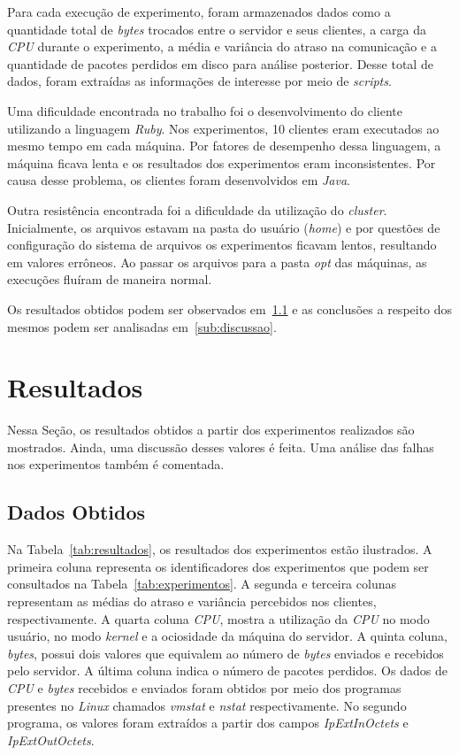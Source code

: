 \documentclass[12pt]{article}
\begin{document}
Para cada execução de experimento, foram armazenados dados como a quantidade
total de \emph{bytes} trocados entre o servidor e seus clientes, a carga da \emph{CPU}
durante o experimento, a média e variância do atraso na comunicação e a
quantidade de pacotes perdidos em disco para análise posterior. Desse total de
dados, foram extraídas as informações de interesse por meio de
\textit{scripts}.

Uma dificuldade encontrada no trabalho foi o desenvolvimento do cliente utilizando a linguagem \emph{Ruby}. Nos experimentos, 10 clientes eram executados ao mesmo tempo em cada máquina. Por fatores de desempenho dessa linguagem, a máquina ficava lenta e os resultados dos experimentos eram inconsistentes. Por causa desse problema, os clientes foram desenvolvidos em \emph{Java}.

Outra resistência encontrada foi a dificuldade da utilização do \emph{cluster}. Inicialmente, os arquivos estavam na pasta do usuário (\emph{home}) e por questões de configuração do sistema de arquivos os experimentos ficavam lentos, resultando em valores errôneos. Ao passar os arquivos para a pasta \emph{opt} das máquinas, as execuções fluíram de maneira normal. 

Os resultados obtidos podem ser observados em~\ref{sub:dados} e as conclusões a
respeito dos mesmos podem ser analisadas em~\ref{sub:discussao}.

\section{Resultados} \label{sec:resultados}

Nessa Seção, os resultados obtidos a partir dos experimentos realizados são mostrados. Ainda, uma discussão desses valores é feita. Uma análise das falhas nos experimentos também é comentada.

\subsection{Dados Obtidos} \label{sub:dados}

Na Tabela~\ref{tab:resultados}, os resultados dos experimentos estão ilustrados. A primeira coluna representa os identificadores dos experimentos que podem ser consultados na Tabela~\ref{tab:experimentos}. A segunda e terceira colunas representam as médias do atraso e variância percebidos nos clientes, respectivamente. A quarta coluna \emph{CPU}, mostra a utilização da \emph{CPU} no modo usuário, no modo \emph{kernel} e a ociosidade da máquina do servidor. A quinta coluna, \emph{bytes}, possui dois valores que equivalem ao número de \emph{bytes} enviados e recebidos pelo servidor. A última coluna indica o número de pacotes perdidos. Os dados de \emph{CPU} e \emph{bytes} recebidos e enviados foram obtidos por meio dos programas presentes no \emph{Linux} chamados \emph{vmstat} \cite{Vmstat} e \emph{nstat} \cite{nstat} respectivamente. No segundo programa, os valores foram extraídos a partir dos campos \emph{IpExtInOctets} e \emph{IpExtOutOctets}.
\end{document}
